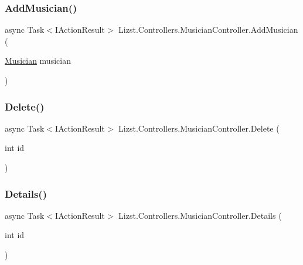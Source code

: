 \subsubsection{\texorpdfstring{AddMusician()}{AddMusician()}\hspace{0.1cm}{\footnotesize\ttfamily [2/2]}}
{\footnotesize\ttfamily async Task$<$I\+Action\+Result$>$ Lizst.\+Controllers.\+Musician\+Controller.\+Add\+Musician (\begin{DoxyParamCaption}\item[{\mbox{\hyperlink{class_lizst_1_1_models_1_1_musician}{Musician}}}]{musician }\end{DoxyParamCaption})}

\mbox{\label{class_lizst_1_1_controllers_1_1_musician_controller_a765ab694fab808c49fa298679e75dbc6}} 
\subsubsection{\texorpdfstring{Delete()}{Delete()}}
{\footnotesize\ttfamily async Task$<$I\+Action\+Result$>$ Lizst.\+Controllers.\+Musician\+Controller.\+Delete (\begin{DoxyParamCaption}\item[{int}]{id }\end{DoxyParamCaption})}

\mbox{\label{class_lizst_1_1_controllers_1_1_musician_controller_a4461628c5e2ff65bec1c9008c68b9c74}} 
\subsubsection{\texorpdfstring{Details()}{Details()}}
{\footnotesize\ttfamily async Task$<$I\+Action\+Result$>$ Lizst.\+Controllers.\+Musician\+Controller.\+Details (\begin{DoxyParamCaption}\item[{int}]{id }\end{DoxyParamCaption})}

